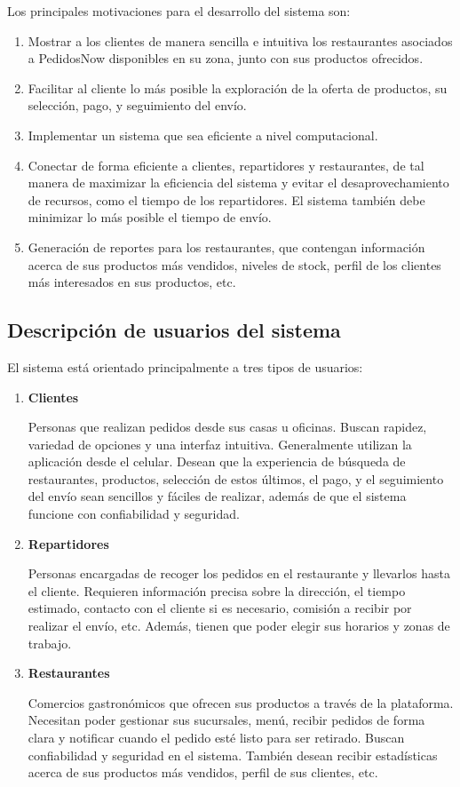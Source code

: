 Los principales motivaciones para el desarrollo del sistema son:

\begin{enumerate}
    \item Mostrar a los clientes de manera sencilla e intuitiva los restaurantes asociados a PedidosNow disponibles en su zona, junto con sus productos ofrecidos.
    \item Facilitar al cliente lo más posible la exploración de la oferta de productos, su selección, pago, y seguimiento del envío.
    \item Implementar un sistema que sea eficiente a nivel computacional.
    \item Conectar de forma eficiente a clientes, repartidores y restaurantes, de tal manera de maximizar la eficiencia del sistema y evitar el desaprovechamiento de recursos, como el tiempo de los repartidores. El sistema también debe minimizar lo más posible el tiempo de envío.
    \item Generación de reportes para los restaurantes, que contengan información acerca de sus productos más vendidos, niveles de stock, perfil de los clientes más interesados en sus productos, etc.
\end{enumerate}

\subsection{Descripción de usuarios del sistema}
El sistema está orientado principalmente a tres tipos de usuarios:

\begin{enumerate}
    \item \textbf{Clientes}
    
    Personas que realizan pedidos desde sus casas u oficinas. Buscan rapidez, variedad de opciones y una interfaz intuitiva. Generalmente utilizan la aplicación desde el celular. Desean que la experiencia de búsqueda de restaurantes, productos, selección de estos últimos, el pago, y el seguimiento del envío sean sencillos y fáciles de realizar, además de que el sistema funcione con confiabilidad y seguridad.

    \item \textbf{Repartidores}
    
    Personas encargadas de recoger los pedidos en el restaurante y llevarlos hasta el cliente. Requieren información precisa sobre la dirección, el tiempo estimado, contacto con el cliente si es necesario, comisión a recibir por realizar el envío, etc. Además, tienen que poder elegir sus horarios y zonas de trabajo.

    \item \textbf{Restaurantes}
    
    Comercios gastronómicos que ofrecen sus productos a través de la plataforma. Necesitan poder gestionar sus sucursales, menú, recibir pedidos de forma clara y notificar cuando el pedido esté listo para ser retirado. Buscan confiabilidad y seguridad en el sistema. También desean recibir estadísticas acerca de sus productos más vendidos, perfil de sus clientes, etc.
\end{enumerate}

